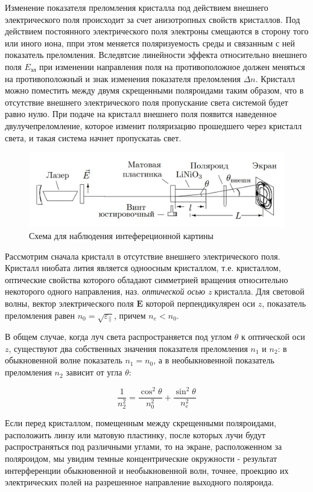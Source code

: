 \documentclass[a4paper,12pt]{article}
\begin{document}
Изменение показателя преломления кристалла под действием внешнего электрического поля происходит за счет анизотропных свойств кристаллов. Под действием постоянного электрического поля электроны смещаются в сторону того или иного иона, ппри этом меняется поляризуемость среды и связанным с ней показатель преломления. Вследвтсие линейности эффекта относительно внешнего поля $E_\text{эл}$ при изменении направления поля на противоположное должен меняться на противоположный и знак изменения показателя преломления $\Delta n$. Кристалл можно поместить между двумя скрещенными поляроидами таким образом, что в отсутствие внешнего электрического поля пропускание света системой будет равно нулю. При подаче на кристалл внешнего поля появится наведенное двулучепреломление, которое изменит поляризацию прошедшего через кристалл света, и такая система начнет пропускатаь свет. 

\begin{figure}[h]
\centering
\includegraphics[width=0.8\linewidth]{img1.png}
\caption{Схема для наблюдения интефереционной картины}
\label{img1}
\end{figure}

Рассмотрим сначала кристалл в отсутствие внешнего электрического поля. Кристалл ниобата лития является одноосным кристаллом, т.е. кристаллом, оптические свойства которого обладают симметрией вращения относительно некоторого одного направления, наз. \textit{оптической осью z} кристалла. Для световой волны, вектор электрического поля $\mathbf{E}$ которой перпендикулярен оси $z$, показатель преломления равен $n_0=\sqrt{\varepsilon_{||}}$, причем $n_e<n_0$.

В общем случае, когда луч света распространяется под углом $\theta$ к оптической оси $z$, существуют два собственных значения показателя преломления $n_1$ и $n_2$: в обыкновенной волне показатель $n_1=n_0$, а в необыкновенной показатель преломления $n_2$ зависит от угла $\theta$:

\begin{equation}
    \frac{1}{n_2^2}=\frac{\cos^2{\theta}}{n_0^2}+\frac{\sin^2{\theta}}{n_e^2}
\end{equation}

Если перед кристаллом, помещенным между скрещенными поляроидами, расположить линзу или матовую пластинку, после которых лучи будут распространяться под различными углами, то на экране, расположенном за поляроидом, мы увидим темные концентрические окружности - результат интерференции обыкновенной и необыкновенной волн, точнее, проекцию их электрических полей на разрешенное направление выходного поляроида.
\end{document}
